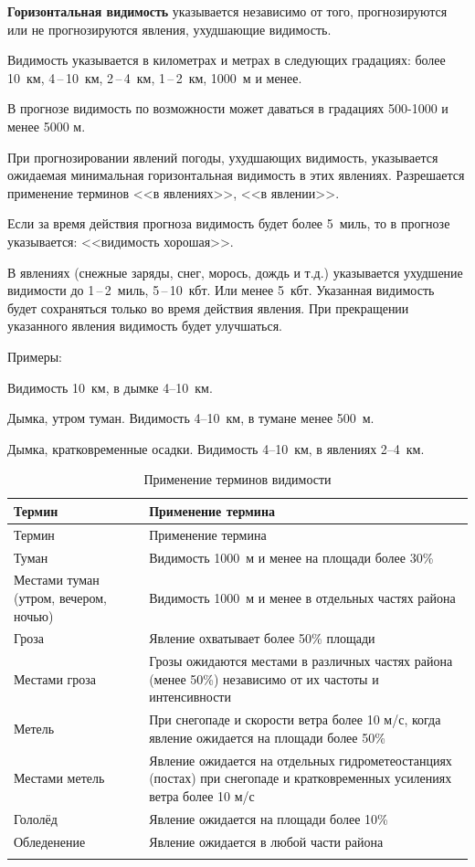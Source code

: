 \documentclass[a4paper, 12pt, twoside, final, book, russian, fittopage, cyremdash, openright]{ncc}
\newcommand{\otdo}{\,--\,}
\begin{document}
\textbf{Горизонтальная видимость} указывается независимо от того,
прогнозируются или не прогнозируются явления, ухудшающие видимость.

Видимость указывается в километрах и метрах в следующих градациях:
более 10~км, 4\otdo10~км, 2\otdo4~км, 1\otdo2~км, 1000~м и менее.

В прогнозе видимость по возможности может даваться в градациях
500-1000 и менее 5000 м.

При прогнозировании явлений погоды, ухудшающих видимость, указывается
ожидаемая минимальная горизонтальная видимость в этих
явлениях. Разрешается применение терминов <<в явлениях>>,
<<в явлении>>.

Если за время действия прогноза видимость будет более 5~миль, то в
прогнозе указывается: <<видимость хорошая>>.

В явлениях (снежные заряды, снег, морось, дождь и т.д.) указывается
ухудшение видимости до 1\otdo2~миль, 5\otdo10~кбт. Или менее
5~кбт. Указанная видимость будет сохраняться только во время действия
явления. При прекращении указанного явления видимость будет
улучшаться.

Примеры:
\begin{list}{}{}
\item Видимость 10~км, в дымке 4--10~км.
\item Дымка, утром туман. Видимость 4--10~км, в тумане менее 500~м.
\item Дымка, кратковременные осадки. Видимость 4--10~км, в явлениях 2--4~км.
\end{list}

\begin{longtable}{p{}|p{}}
  \toprule
  Термин & Применение термина \\
  \midrule
  \endfirsthead
  \toprule
  Термин & Применение термина \\
  \midrule
  \endhead
  Туман
         & Видимость 1000~м и менее на площади более 30\% \\
  \midrule
  Местами туман (утром, вечером, ночью)
         & Видимость 1000~м и менее в отдельных частях района \\
  \midrule
  Гроза
         & Явление охватывает более 50\% площади \\
  \midrule
  Местами гроза
         & Грозы ожидаются местами в различных частях района (менее 50\%) независимо от их частоты и интенсивности \\
  \midrule
  Метель
         & При снегопаде и скорости ветра более 10 м/с, когда явление ожидается на площади более 50\% \\
  \midrule
  Местами метель
         & Явление ожидается на отдельных гидрометеостанциях (постах) при снегопаде и кратковременных усилениях ветра более 10 м/с \\
  \midrule
  Гололёд
         & Явление ожидается на площади более 10\% \\
  \midrule
  Обледенение
         & Явление ожидается в любой части района \\
  \bottomrule
  \caption{Применение терминов видимости}
\end{longtable}
\end{document}
